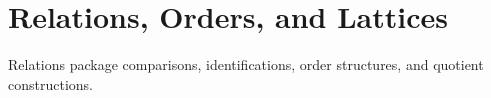 \section{Relations, Orders, and Lattices}

Relations package comparisons, identifications, order structures, and quotient constructions.








